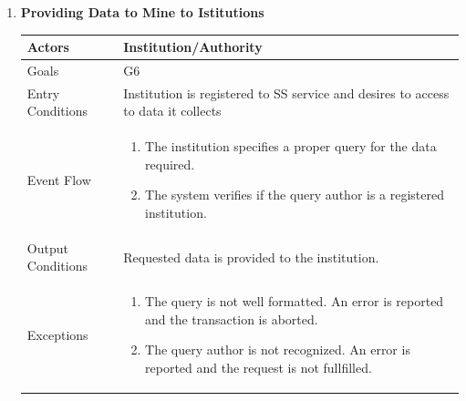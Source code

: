 \begin{enumerate}
	\item \textbf{Providing Data to Mine to Istitutions}
		\begin{table}[h!]
		\centering
		\begin{tabular}{|l|p{}|}
		\hline
		Actors            			&       	Institution/Authority\\ \hline
		Goals             			&         	G6\\ \hline
		Entry Conditions  	&  		Institution is registered to SS service and desires to access to data it collects\\ \hline
		Event Flow        		&          
				\begin{enumerate}[label=\alph*)]
					\item The institution specifies a proper query for the data required.
					\item The system verifies if the query author is a registered institution.
					\end{enumerate}\\ \hline
		Output Conditions &    		Requested data is provided to the institution. \\ \hline
		Exceptions        		&
		       	\begin{enumerate}[label=\alph*)]
		       		\item The query is not well formatted. An error is reported and the transaction is aborted.
		       		\item The query author is not recognized. An error is reported and the request is not fullfilled. 
		       	\end{enumerate}\\ \hline
	\end{tabular}
	\end{table}
	
		\clearpage
	

\end{enumerate}
